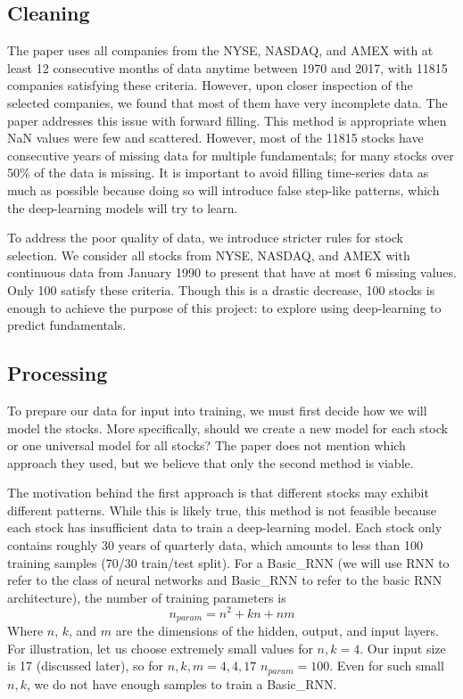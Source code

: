 \documentclass[11pt, letterpaper, headings=standardclasses]{scrartcl}
\begin{document}
    \subsection{Cleaning}
    The paper uses all companies from the NYSE, NASDAQ, and AMEX with at least 12 consecutive months of data anytime between 1970 and 2017, with 11815 companies satisfying these criteria. However, upon closer inspection of the selected companies, we found that most of them have very incomplete data. The paper addresses this issue with forward filling. This method is appropriate when NaN values were few and scattered. However, most of the 11815 stocks have consecutive years of missing data for multiple fundamentals; for many stocks over 50\% of the data is missing. It is important to avoid filling time-series data as much as possible because doing so will introduce false step-like patterns, which the deep-learning models will try to learn.
    
    To address the poor quality of data, we introduce stricter rules for stock selection. We consider all stocks from NYSE, NASDAQ, and AMEX with continuous data from January 1990 to present that have at most 6 missing values. Only 100 satisfy these criteria. Though this is a drastic decrease, 100 stocks is enough to achieve the purpose of this project: to explore using deep-learning to predict fundamentals.
    
    \subsection{Processing}
    To prepare our data for input into training, we must first decide how we will model the stocks. More specifically, should we create a new model for each stock or one universal model for all stocks? The paper does not mention which approach they used, but we believe that only the second method is viable. 

    The motivation behind the first approach is that different stocks may exhibit different patterns. While this is likely true, this method is not feasible because each stock has insufficient data to train a deep-learning model. Each stock only contains roughly 30 years of quarterly data, which amounts to less than 100 training samples (70/30 train/test split). For a Basic\_RNN (we will use RNN to refer to the class of neural networks and Basic\_RNN to refer to the basic RNN architecture), the number of training parameters is  
    $$n_{param} = n^2 + kn + nm$$
    Where $n$, $k$, and $m$ are the dimensions of the hidden, output, and input layers. For illustration, let us choose extremely small values for $n,k = 4$. Our input size is 17 (discussed later), so for $n,k,m = 4,4,17$ $n_{param} = 100$. Even for such small $n,k$, we do not have enough samples to train a Basic\_RNN.
\end{document}
